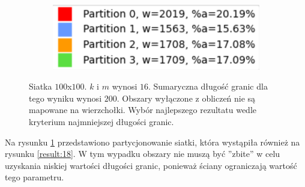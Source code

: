 \begin{figure}[h]
\begin{subfigure}{.33\textwidth}
    \caption[short]{}
\end{subfigure}
\begin{subfigure}{.33\textwidth}
    \centering
    \includegraphics[width=0.9\linewidth]{images/results/m/5/results}
    \caption[short]{}
\end{subfigure}
\caption{Siatka $100$x$100$. $k$ i $m$ wynosi $16$.
Sumaryczna długość granic dla tego wyniku wynosi $200$.
Obszary wyłączone z obliczeń nie są mapowane na wierzchołki.
Wybór najlepszego rezultatu wedle kryterium najmniejszej długości granic.}
\label{result:m:5}
\end{figure}

Na rysunku \ref{result:m:5} przedstawiono partycjonowanie siatki, która wystąpiła również na rysunku \ref{result:18}.
W tym wypadku obszary nie muszą być ''zbite'' w celu uzyskania niskiej wartości długości granic, ponieważ
ściany ograniczają wartość tego parametru.
